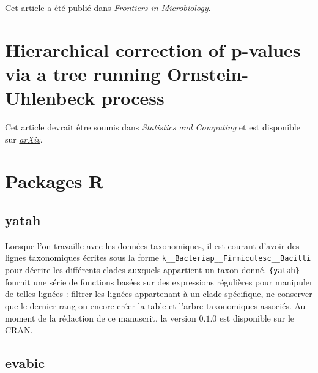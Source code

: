 \documentclass[12pt,a4paper]{reedthesis}
\theoremstyle{definition}
\theoremstyle{definition}
\theoremstyle{definition}
\theoremstyle{remark}
\begin{document}
Cet article a été publié dans \href{https://doi.org/10.3389/fmicb.2020.00649}{\emph{Frontiers in Microbiology}}.





\hypertarget{hierarchical-correction-of-p-values-via-a-tree-running-ornstein-uhlenbeck-process}{%
\section*{Hierarchical correction of p-values via a tree running Ornstein-Uhlenbeck process}\label{hierarchical-correction-of-p-values-via-a-tree-running-ornstein-uhlenbeck-process}}

Cet article devrait être soumis dans \emph{Statistics and Computing} et est disponible sur \href{http://arxiv.org/abs/2009.13335}{\emph{arXiv}}.



\hypertarget{packages-r}{%
\section*{Packages R}\label{packages-r}}

\hypertarget{yatah}{%
\subsection*{yatah}\label{yatah}}

Lorsque l'on travaille avec les données taxonomiques, il est courant d'avoir des lignes taxonomiques écrites sous la forme \texttt{k\_\_Bacteria\textbar{}p\_\_Firmicutes\textbar{}c\_\_Bacilli} pour décrire les différents clades auxquels appartient un taxon donné. \texttt{\{yatah\}} fournit une série de fonctions basées sur des expressions régulières pour manipuler de telles lignées : filtrer les lignées appartenant à un clade spécifique, ne conserver que le dernier rang ou encore créer la table et l'arbre taxonomiques associés. Au moment de la rédaction de ce manuscrit, la version \(0.1.0\) est disponible sur le CRAN.

\hypertarget{evabic}{%
\subsection*{evabic}\label{evabic}}
\end{document}
